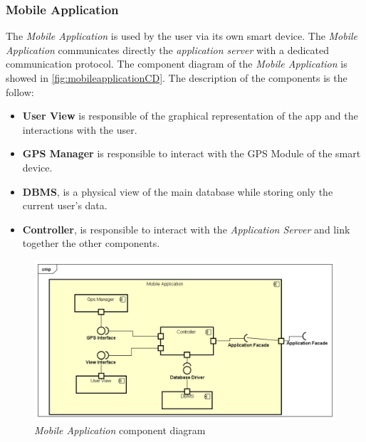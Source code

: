 \subsubsection{Mobile Application}
The \emph{Mobile Application} is used by the user via its own smart device. The \emph{Mobile Application} communicates directly the \emph{application server} with a dedicated communication protocol.
The component diagram of the \emph{Mobile Application} is showed in \autoref{fig:mobileapplicationCD}.
The description of the components is the follow:
\begin{itemize}
	\item \textbf{User View} is responsible of the graphical representation of the app and the interactions with the user.
	\item \textbf{GPS Manager} is responsible to interact with the GPS Module of the smart device.
	\item \textbf{DBMS}, is a physical view of the main database while storing only the current user's data. 
	\item \textbf{Controller}, is responsible to interact with the \emph{Application Server} and link together the other components.
\end{itemize}

\begin{figure}
	\includegraphics[width = \textwidth, keepaspectratio = true]{Img/MobileApplication}
	\caption{\emph{Mobile Application} component diagram}
	\label{fig:mobileapplicationCD}
\end{figure}

\clearpage
